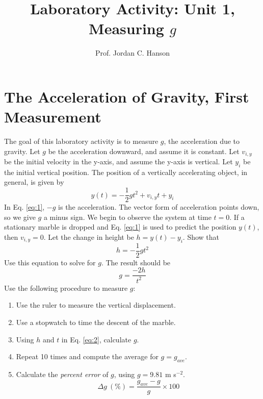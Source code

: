 \documentclass{article}
\begin{document}
\twocolumn

\title{Laboratory Activity: Unit 1, Measuring $g$}
\author{Prof. Jordan C. Hanson}

\maketitle

\section{The Acceleration of Gravity, First Measurement}

The goal of this laboratory activity is to measure $g$, the acceleration due to gravity.  Let $g$ be the acceleration downward, and assume it is constant.  Let $v_{i,y}$ be the initial velocity in the y-axis, and assume the y-axis is vertical.  Let $y_i$ be the initial vertical position.  The position of a vertically accelerating object, in general, is given by
\begin{equation}
y(t) = -\frac{1}{2}gt^2 + v_{i,y} t + y_i \label{eq:1}
\end{equation}
In Eq. \ref{eq:1}, $-g$ is the acceleration.  The vector form of acceleration points down, so we give $g$ a minus sign.  We begin to observe the system at time $t=0$.  If a stationary marble is dropped and Eq. \ref{eq:1} is used to predict the position $y(t)$, then $v_{i,y} = 0$.  Let the change in height be $h = y(t) - y_i$.  Show that
\begin{equation}
h = -\frac{1}{2}g t^2
\end{equation}
Use this equation to solve for $g$.  The result should be
\begin{equation}
g = \frac{-2h}{t^2} \label{eq:2}
\end{equation}
Use the following procedure to measure $g$:
\begin{enumerate}
\item Use the ruler to measure the vertical displacement.
\item Use a stopwatch to time the descent of the marble.
\item Using $h$ and $t$ in Eq. \ref{eq:2}, calculate $g$.
\item Repeat 10 times and compute the average for $g = g_{ave}$.
\item Calculate the \textit{percent error} of $g$, using $g = 9.81$ m s$^{-2}$.
\begin{equation}
\Delta g ~ (\%) = \frac{g_{ave} - g}{g} \times 100
\end{equation}
\end{enumerate}
\end{document}
